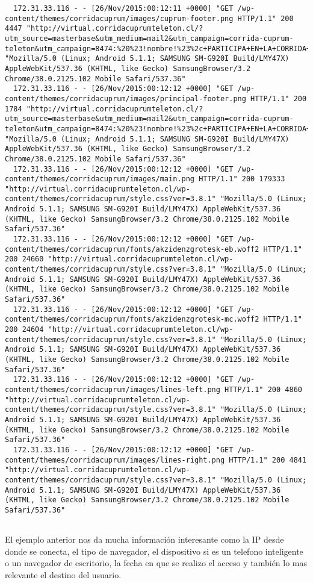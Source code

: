 \begin{verbatim}
  172.31.33.116 - - [26/Nov/2015:00:12:11 +0000] "GET /wp-content/themes/corridacuprum/images/cuprum-footer.png HTTP/1.1" 200 4447 "http://virtual.corridacuprumteleton.cl/?utm_source=masterbase&utm_medium=mail2&utm_campaign=corrida-cuprum-teleton&utm_campaign=8474:%20%23!nombre!%23%2c+PARTICIPA+EN+LA+CORRIDA+VIRTUAL+Y+APOYA++A+LA+TELETON&utm_source=MasterBase%20CUPRUM&utm_medium=email&utm_content=2&utm_term=none" "Mozilla/5.0 (Linux; Android 5.1.1; SAMSUNG SM-G920I Build/LMY47X) AppleWebKit/537.36 (KHTML, like Gecko) SamsungBrowser/3.2 Chrome/38.0.2125.102 Mobile Safari/537.36"
  172.31.33.116 - - [26/Nov/2015:00:12:12 +0000] "GET /wp-content/themes/corridacuprum/images/principal-footer.png HTTP/1.1" 200 1784 "http://virtual.corridacuprumteleton.cl/?utm_source=masterbase&utm_medium=mail2&utm_campaign=corrida-cuprum-teleton&utm_campaign=8474:%20%23!nombre!%23%2c+PARTICIPA+EN+LA+CORRIDA+VIRTUAL+Y+APOYA++A+LA+TELETON&utm_source=MasterBase%20CUPRUM&utm_medium=email&utm_content=2&utm_term=none" "Mozilla/5.0 (Linux; Android 5.1.1; SAMSUNG SM-G920I Build/LMY47X) AppleWebKit/537.36 (KHTML, like Gecko) SamsungBrowser/3.2 Chrome/38.0.2125.102 Mobile Safari/537.36"
  172.31.33.116 - - [26/Nov/2015:00:12:12 +0000] "GET /wp-content/themes/corridacuprum/images/main.png HTTP/1.1" 200 179333 "http://virtual.corridacuprumteleton.cl/wp-content/themes/corridacuprum/style.css?ver=3.8.1" "Mozilla/5.0 (Linux; Android 5.1.1; SAMSUNG SM-G920I Build/LMY47X) AppleWebKit/537.36 (KHTML, like Gecko) SamsungBrowser/3.2 Chrome/38.0.2125.102 Mobile Safari/537.36"
  172.31.33.116 - - [26/Nov/2015:00:12:12 +0000] "GET /wp-content/themes/corridacuprum/fonts/akzidenzgrotesk-eb.woff2 HTTP/1.1" 200 24660 "http://virtual.corridacuprumteleton.cl/wp-content/themes/corridacuprum/style.css?ver=3.8.1" "Mozilla/5.0 (Linux; Android 5.1.1; SAMSUNG SM-G920I Build/LMY47X) AppleWebKit/537.36 (KHTML, like Gecko) SamsungBrowser/3.2 Chrome/38.0.2125.102 Mobile Safari/537.36"
  172.31.33.116 - - [26/Nov/2015:00:12:12 +0000] "GET /wp-content/themes/corridacuprum/fonts/akzidenzgrotesk-mc.woff2 HTTP/1.1" 200 24604 "http://virtual.corridacuprumteleton.cl/wp-content/themes/corridacuprum/style.css?ver=3.8.1" "Mozilla/5.0 (Linux; Android 5.1.1; SAMSUNG SM-G920I Build/LMY47X) AppleWebKit/537.36 (KHTML, like Gecko) SamsungBrowser/3.2 Chrome/38.0.2125.102 Mobile Safari/537.36"
  172.31.33.116 - - [26/Nov/2015:00:12:12 +0000] "GET /wp-content/themes/corridacuprum/images/lines-left.png HTTP/1.1" 200 4860 "http://virtual.corridacuprumteleton.cl/wp-content/themes/corridacuprum/style.css?ver=3.8.1" "Mozilla/5.0 (Linux; Android 5.1.1; SAMSUNG SM-G920I Build/LMY47X) AppleWebKit/537.36 (KHTML, like Gecko) SamsungBrowser/3.2 Chrome/38.0.2125.102 Mobile Safari/537.36"
  172.31.33.116 - - [26/Nov/2015:00:12:12 +0000] "GET /wp-content/themes/corridacuprum/images/lines-right.png HTTP/1.1" 200 4841 "http://virtual.corridacuprumteleton.cl/wp-content/themes/corridacuprum/style.css?ver=3.8.1" "Mozilla/5.0 (Linux; Android 5.1.1; SAMSUNG SM-G920I Build/LMY47X) AppleWebKit/537.36 (KHTML, like Gecko) SamsungBrowser/3.2 Chrome/38.0.2125.102 Mobile Safari/537.36"
  	
  \end{verbatim}

  El ejemplo anterior nos da mucha información interesante como la IP desde donde se conecta, el tipo de navegador, el dispositivo si es un telefono inteligente o un navegador de escritorio, la fecha en que se realizo el acceso y también lo mas relevante el destino del usuario.
